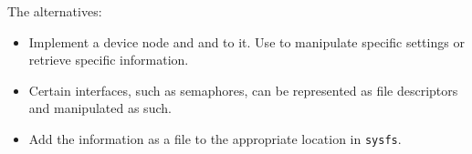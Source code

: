 The alternatives:
\begin{itemize}[noitemsep]
\item Implement a device node and  and  to it.
  Use  to manipulate specific settings or retrieve specific information.
\item Certain interfaces, such as semaphores, can be represented as file descriptors and manipulated as such.
\item Add the information as a file to the appropriate location in \texttt{sysfs}.
\end{itemize}

